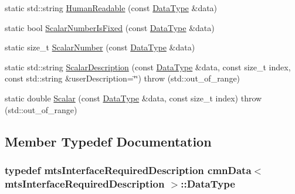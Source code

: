 \begin{DoxyCompactItemize}
\item 
static std\+::string \hyperlink{classcmn_data_3_01mts_interface_required_description_01_4_a81c18ef737c42a17d0c569362c30596d}{Human\+Readable} (const \hyperlink{classcmn_data_3_01mts_interface_required_description_01_4_aa335fadfd965b6b92ab7fa93b18c547d}{Data\+Type} \&data)
\item 
static bool \hyperlink{classcmn_data_3_01mts_interface_required_description_01_4_ad65b6165eca0da3652f0bf05d1393f1e}{Scalar\+Number\+Is\+Fixed} (const \hyperlink{classcmn_data_3_01mts_interface_required_description_01_4_aa335fadfd965b6b92ab7fa93b18c547d}{Data\+Type} \&data)
\item 
static size\+\_\+t \hyperlink{classcmn_data_3_01mts_interface_required_description_01_4_a3ba518cbea4c71bba4dda7c3df7638ce}{Scalar\+Number} (const \hyperlink{classcmn_data_3_01mts_interface_required_description_01_4_aa335fadfd965b6b92ab7fa93b18c547d}{Data\+Type} \&data)
\item 
static std\+::string \hyperlink{classcmn_data_3_01mts_interface_required_description_01_4_a154018c7dfb8b988c49513b8473b02fe}{Scalar\+Description} (const \hyperlink{classcmn_data_3_01mts_interface_required_description_01_4_aa335fadfd965b6b92ab7fa93b18c547d}{Data\+Type} \&data, const size\+\_\+t index, const std\+::string \&user\+Description=\char`\"{}\char`\"{})  throw (std\+::out\+\_\+of\+\_\+range)
\item 
static double \hyperlink{classcmn_data_3_01mts_interface_required_description_01_4_a238469398ea97dc71f91b498222fcc49}{Scalar} (const \hyperlink{classcmn_data_3_01mts_interface_required_description_01_4_aa335fadfd965b6b92ab7fa93b18c547d}{Data\+Type} \&data, const size\+\_\+t index)  throw (std\+::out\+\_\+of\+\_\+range)
\end{DoxyCompactItemize}


\subsection{Member Typedef Documentation}
\hypertarget{classcmn_data_3_01mts_interface_required_description_01_4_aa335fadfd965b6b92ab7fa93b18c547d}{}
\subsubsection[{Data\+Type}]{\setlength{\rightskip}{0pt plus 5cm}typedef {\bf mts\+Interface\+Required\+Description} {\bf cmn\+Data}$<$ {\bf mts\+Interface\+Required\+Description} $>$\+::{\bf Data\+Type}}\label{classcmn_data_3_01mts_interface_required_description_01_4_aa335fadfd965b6b92ab7fa93b18c547d}


